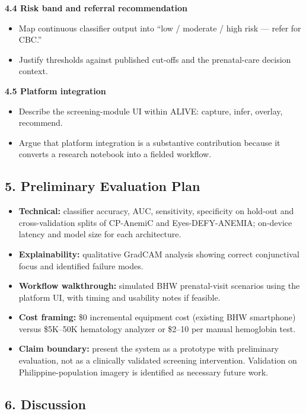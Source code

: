\documentclass[11pt]{article}
\begin{document}
    \textbf{4.4 Risk band and referral recommendation}
    \begin{itemize}[leftmargin=1.5em]
        \item Map continuous classifier output into ``low / moderate / high risk --- refer for CBC.''
        \item Justify thresholds against published cut-offs and the prenatal-care decision context.
    \end{itemize}

    \textbf{4.5 Platform integration}
    \begin{itemize}[leftmargin=1.5em]
        \item Describe the screening-module UI within ALIVE: capture, infer, overlay, recommend.
        \item Argue that platform integration is a substantive contribution because it converts a research notebook into a fielded workflow.
    \end{itemize}

    \subsection{5. Preliminary Evaluation Plan}

    \begin{itemize}[leftmargin=1.5em]
        \item \textbf{Technical:} classifier accuracy, AUC, sensitivity, specificity on hold-out and cross-validation splits of CP-AnemiC and Eyes-DEFY-ANEMIA; on-device latency and model size for each architecture.
        \item \textbf{Explainability:} qualitative GradCAM analysis showing correct conjunctival focus and identified failure modes.
        \item \textbf{Workflow walkthrough:} simulated BHW prenatal-visit scenarios using the platform UI, with timing and usability notes if feasible.
        \item \textbf{Cost framing:} \$0 incremental equipment cost (existing BHW smartphone) versus \$5K--50K hematology analyzer or \$2--10 per manual hemoglobin test.
        \item \textbf{Claim boundary:} present the system as a prototype with preliminary evaluation, not as a clinically validated screening intervention. Validation on Philippine-population imagery is identified as necessary future work.
    \end{itemize}

    \subsection{6. Discussion}
\end{document}
